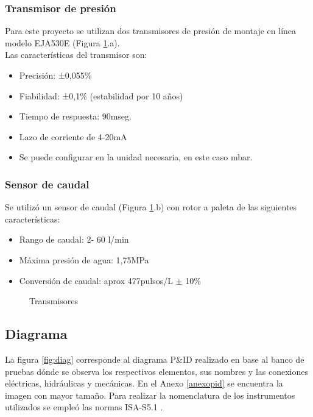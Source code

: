 \subsubsection{Transmisor de presión}
Para este proyecto se utilizan dos transmisores de presión de montaje en línea modelo EJA530E (Figura \ref{fig:transd}.a).\\
Las características del transmisor son:
\begin{itemize}
	\item Precisión: ±0,055\% 
	\item Fiabilidad: ±0,1\% (estabilidad por 10 años)
	\item Tiempo de respuesta: 90mseg.
	\item Lazo de corriente de 4-20mA
	\item Se puede configurar en la unidad necesaria, en este caso mbar.
\end{itemize}


\subsubsection{Sensor de caudal}
Se utilizó un sensor de caudal (Figura \ref{fig:transd}.b) con rotor a paleta de las siguientes características:
\begin{itemize}
	\item Rango de caudal: 2- 60 l/min
	\item Máxima presión de agua: 1,75MPa
	\item Conversión de caudal: aprox 477pulsos/L $\pm$ 10\%
\end{itemize}


\begin{figure}[htbp]
	\centering
	\caption{Transmisores} \label{fig:transd}
\end{figure}





\subsection{Diagrama}
La figura \ref{fig:diag} corresponde al diagrama P\&ID realizado en base al banco de pruebas dónde se observa los respectivos elementos, sus nombres y las conexiones eléctricas, hidráulicas y mecánicas. En el Anexo \ref{anexopid} se encuentra la imagen con mayor tamaño.
 Para realizar la nomenclatura de los instrumentos utilizados se empleó las normas ISA-S5.1 \cite{ISA}. 

